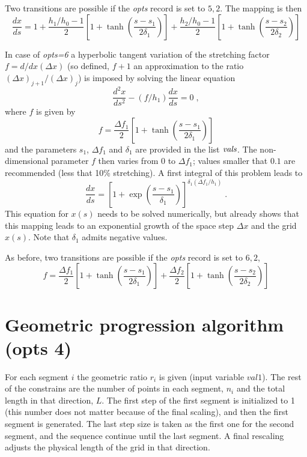 Two transitions are possible if the {\it opts} record is set to $5,2$. The
mapping is then
\begin{equation}
\frac{dx}{ds} = 1 
+ \frac{h_1/h_0-1}{2}\left[ 1 + \tanh\left(\frac{s-s_1}{2\delta_1}\right)\right]
+ \frac{h_2/h_0-1}{2}\left[ 1 + \tanh\left(\frac{s-s_2}{2\delta_2}\right)\right]
\end{equation}

In case of {\it opts=6} a hyperbolic tangent variation of the stretching factor
$f=d/dx (\Delta x)$ (so defined, $f+1$ an approximation to the ratio $(\Delta x)
_{j+1}/(\Delta x) _{j} $) is imposed by solving the linear equation
\begin{equation}
\frac{d^2x}{ds^2} - (f/h_1)\frac{dx}{ds} = 0 \;,
\end{equation}
where $f$ is given by
\begin{equation}
f = \frac{\Delta f_1}{2}\left[ 1 + \tanh\left(\frac{s-s_1}{2\delta_1}\right)\right]
\end{equation}
and the parameters $s_1$, $\Delta f_1$ and $\delta_1$ are provided in the list
${\it vals}$. The non-dimensional parameter $f$ then varies from $0$ to $\Delta
f_1$; values smaller that $0.1$ are recommended (less that 10\% stretching). A
first integral of this problem leads to
\begin{equation}
\frac{dx}{ds} =
\left[1+\exp\left(\frac{s-s_1}{\delta_1}\right)\right]^{\delta_1(\Delta f_1/h_1)} \;.
\end{equation}
This equation for $x(s)$ needs to be solved numerically, but already shows that
this mapping leads to an exponential growth of the space step $\Delta x$ and the
grid $x(s)$. Note that $\delta_1$ admits negative values.

As before, two transitions are possible if the {\it opts} record is set to $6,2$,
\begin{equation}
f = \frac{\Delta f_1}{2}\left[ 1 + \tanh\left(\frac{s-s_1}{2\delta_1}\right)\right]
+ \frac{\Delta f_2}{2}\left[ 1 + \tanh\left(\frac{s-s_2}{2\delta_2}\right)\right]
\end{equation}

\section{Geometric progression algorithm (opts 4)}
For each segment $i$ the geometric ratio $r_i$ is given (input variable
$val1$). The rest of the constrains are the number of points in each segment,
$n_i$ and the total length in that direction, $L$.  The first step of the first
segment is initialized to 1 (this number does not matter because of the final
scaling), and then the first segment is generated. The last step size is taken
as the first one for the second segment, and the sequence continue until the
last segment. A final rescaling adjusts the physical length of the grid in that
direction.

